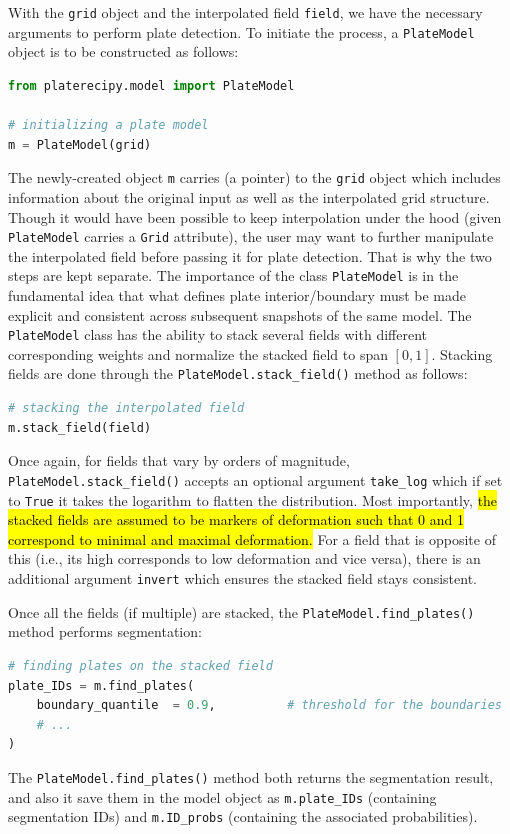 \documentclass[12pt,letterpaper]{article}
\begin{document}
With the \texttt{grid} object and the interpolated field \texttt{field}, we have the necessary arguments to perform plate detection. To initiate the process, a \texttt{PlateModel} object is to be constructed as follows:
\begin{lstlisting}[language=Python]
from platerecipy.model import PlateModel

# initializing a plate model
m = PlateModel(grid)
\end{lstlisting}
The newly-created object \texttt{m} carries (a pointer) to the \texttt{grid} object which includes information about the original input as well as the 
interpolated grid structure. Though it would have been possible to keep
interpolation under the hood (given \texttt{PlateModel} carries a \texttt{Grid} attribute), the user may want to further manipulate the 
interpolated field before passing it for plate detection. That is why
the two steps are kept separate. The importance of the class \texttt{PlateModel}
is in the fundamental idea that what defines plate interior/boundary must be 
made explicit and consistent across subsequent snapshots of the same model. The 
\texttt{PlateModel} class has the ability to stack several fields with different
corresponding weights and normalize the stacked field to span $[0, 1]$. Stacking 
fields are done through the \texttt{PlateModel.stack\_field()} method as follows:
\begin{lstlisting}[language=Python]
# stacking the interpolated field
m.stack_field(field)
\end{lstlisting}
Once again, for fields that vary by orders of magnitude, \texttt{PlateModel.stack\_field()}
accepts an optional argument \texttt{take\_log} which if set to \texttt{True} it takes
the logarithm to flatten the distribution. Most importantly, \hl{the stacked fields 
are assumed to be markers of deformation such that 0 and 1 correspond to minimal 
and maximal deformation.} For a field that is opposite of this (i.e., its high corresponds
to low deformation and vice versa), there is an additional argument \texttt{invert} 
which ensures the stacked field stays consistent.

Once all the fields (if multiple) are stacked, the \texttt{PlateModel.find\_plates()}
method performs segmentation:
\begin{lstlisting}[language=Python]
# finding plates on the stacked field
plate_IDs = m.find_plates(
    boundary_quantile  = 0.9,          # threshold for the boundaries 
    # ...
)
\end{lstlisting}
The \texttt{PlateModel.find\_plates()} method both returns the segmentation result, 
and also it save them in the model object as \texttt{m.plate\_IDs} (containing segmentation IDs) 
and \texttt{m.ID\_probs} (containing the associated probabilities).
\end{document}
